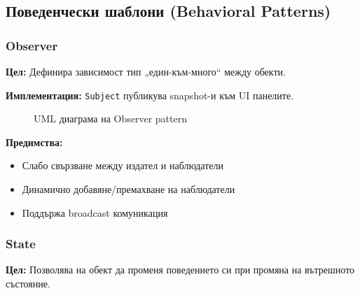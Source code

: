 \documentclass{article}
\begin{document}
\subsection{Поведенчески шаблони (Behavioral Patterns)}

\subsubsection{Observer}

\textbf{Цел:} Дефинира зависимост тип „един-към-много“ между обекти.

\textbf{Имплементация:} \texttt{Subject} публикува snapshot-и към UI панелите.

\begin{figure}[H]
	\centering
	\caption{UML диаграма на Observer pattern}
\end{figure}

\textbf{Предимства:}
\begin{itemize}
	\item Слабо свързване между издател и наблюдатели
	\item Динамично добавяне/премахване на наблюдатели
	\item Поддържа broadcast комуникация
\end{itemize}

\subsubsection{State}

\textbf{Цел:} Позволява на обект да променя поведението си при промяна на вътрешното състояние.
\end{document}
